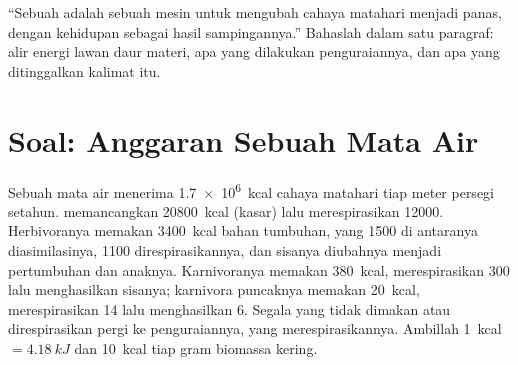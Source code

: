 \begin{exercise}[$\star\star\star$]\label{exo:b1:ecosystem-organization:12}
``Sebuah  adalah sebuah mesin untuk mengubah cahaya matahari
menjadi panas, dengan kehidupan sebagai hasil sampingannya.'' Bahaslah
dalam satu paragraf: alir energi lawan daur materi, apa yang dilakukan
penguraiannya, dan apa yang ditinggalkan kalimat itu.
\end{exercise}

\section{Soal: Anggaran Sebuah Mata Air}

\begin{problem}
\label{pb:b1:ecosystem-organization:1}
Sebuah mata air menerima \qty{1.7e6}{kcal} cahaya matahari tiap meter
persegi setahun.  memancangkan \qty{20800}{kcal} (kasar)
lalu merespirasikan \qty{12000}{}. Herbivoranya memakan
\qty{3400}{kcal} bahan tumbuhan, yang \qty{1500}{} di antaranya
diasimilasinya, \qty{1100}{} direspirasikannya, dan sisanya diubahnya
menjadi pertumbuhan dan anaknya. Karnivoranya memakan \qty{380}{kcal},
merespirasikan \qty{300}{} lalu menghasilkan sisanya; karnivora
puncaknya memakan \qty{20}{kcal}, merespirasikan \qty{14}{} lalu
menghasilkan \qty{6}{}. Segala yang tidak dimakan atau direspirasikan
pergi ke penguraiannya, yang merespirasikannya. Ambillah
\qty{1}{kcal} $= \qty{4.18}{kJ}$ dan \qty{10}{kcal} tiap gram biomassa
kering.


\end{problem}
